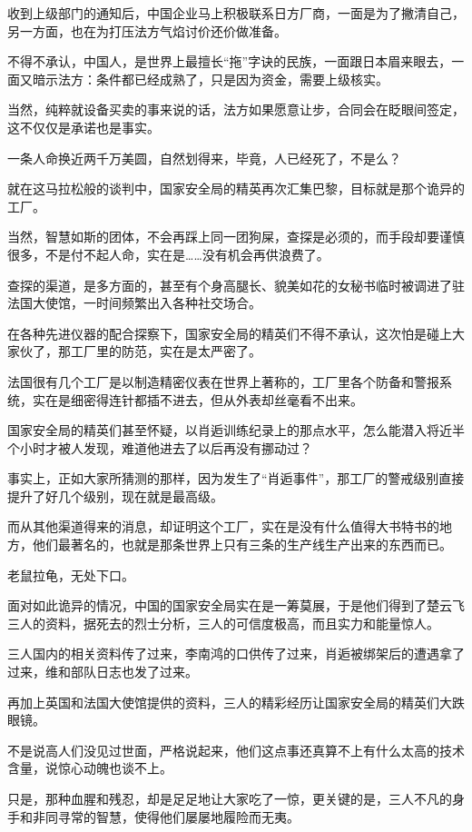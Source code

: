 收到上级部门的通知后，中国企业马上积极联系日方厂商，一面是为了撇清自己，另一方面，也在为打压法方气焰讨价还价做准备。

不得不承认，中国人，是世界上最擅长“拖”字诀的民族，一面跟日本眉来眼去，一面又暗示法方：条件都已经成熟了，只是因为资金，需要上级核实。

当然，纯粹就设备买卖的事来说的话，法方如果愿意让步，合同会在眨眼间签定，这不仅仅是承诺也是事实。

一条人命换近两千万美圆，自然划得来，毕竟，人已经死了，不是么？

就在这马拉松般的谈判中，国家安全局的精英再次汇集巴黎，目标就是那个诡异的工厂。

当然，智慧如斯的团体，不会再踩上同一团狗屎，查探是必须的，而手段却要谨慎很多，不是付不起人命，实在是……没有机会再供浪费了。

查探的渠道，是多方面的，甚至有个身高腿长、貌美如花的女秘书临时被调进了驻法国大使馆，一时间频繁出入各种社交场合。

在各种先进仪器的配合探察下，国家安全局的精英们不得不承认，这次怕是碰上大家伙了，那工厂里的防范，实在是太严密了。

法国很有几个工厂是以制造精密仪表在世界上著称的，工厂里各个防备和警报系统，实在是细密得连针都插不进去，但从外表却丝毫看不出来。

国家安全局的精英们甚至怀疑，以肖逅训练纪录上的那点水平，怎么能潜入将近半个小时才被人发现，难道他进去了以后再没有挪动过？

事实上，正如大家所猜测的那样，因为发生了“肖逅事件”，那工厂的警戒级别直接提升了好几个级别，现在就是最高级。

而从其他渠道得来的消息，却证明这个工厂，实在是没有什么值得大书特书的地方，他们最著名的，也就是那条世界上只有三条的生产线生产出来的东西而已。

老鼠拉龟，无处下口。

面对如此诡异的情况，中国的国家安全局实在是一筹莫展，于是他们得到了楚云飞三人的资料，据死去的烈士分析，三人的可信度极高，而且实力和能量惊人。

三人国内的相关资料传了过来，李南鸿的口供传了过来，肖逅被绑架后的遭遇拿了过来，维和部队日志也发了过来。

再加上英国和法国大使馆提供的资料，三人的精彩经历让国家安全局的精英们大跌眼镜。

不是说高人们没见过世面，严格说起来，他们这点事还真算不上有什么太高的技术含量，说惊心动魄也谈不上。

只是，那种血腥和残忍，却是足足地让大家吃了一惊，更关键的是，三人不凡的身手和非同寻常的智慧，使得他们屡屡地履险而无夷。

